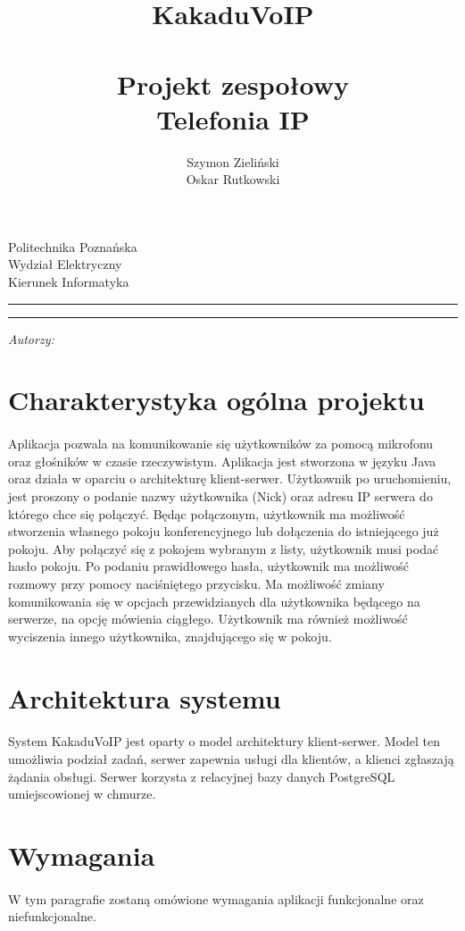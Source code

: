 \documentclass[12pt,a4paper,notitlepage]{report}
\author{Szymon Zieliński \\ Oskar Rutkowski }
\title{KakaduVoIP \\ \\ Projekt zespołowy  \\ Telefonia IP}
\makeatletter
\newcommand{\linia}{\rule{\linewidth}{0.5mm}}
\renewcommand{\maketitle}{\begin{titlepage}
		
		\vspace*{1cm}
		
		\begin{center}\small
			
			Politechnika Poznańska\\
			
			Wydział Elektryczny\\
			
			Kierunek Informatyka
			
		\end{center}
		
		\vspace{3cm}
		
		\linia
		
		\begin{center}
			
			\LARGE \textsc{\@title}
			
		\end{center}
		
		\linia
		
		\vspace{0.5cm}
		
		\begin{flushright}
			
			\begin{minipage}{5cm}
				
				\textit{ Autorzy:}\\
				
				\normalsize{\@author} \par
				
			\end{minipage}
			
		\end{flushright}
		
		\vspace*{\stretch{6}}
		
		\begin{center}
			
			\@date
			
		\end{center}
		
	\end{titlepage}%
	
}
\makeatother
\begin{document}
	
	\maketitle
	\newpage
	\tableofcontents
	\newpage
	
	\section{Charakterystyka ogólna projektu}
	\paragraph*{} Aplikacja pozwala na komunikowanie się użytkowników za pomocą mikrofonu oraz głośników w czasie rzeczywistym. Aplikacja jest stworzona w języku Java oraz działa w oparciu o architekturę klient-serwer. Użytkownik po uruchomieniu, jest proszony o podanie nazwy użytkownika (Nick) oraz adresu IP serwera do którego chce się połączyć. Będąc połączonym, użytkownik ma możliwość stworzenia własnego pokoju konferencyjnego lub dołączenia do istniejącego już pokoju. Aby połączyć się z pokojem wybranym z listy, użytkownik musi podać hasło pokoju. Po podaniu prawidłowego hasła, użytkownik ma możliwość rozmowy przy pomocy naciśniętego przycisku. Ma możliwość zmiany komunikowania się w opcjach przewidzianych dla użytkownika będącego na serwerze, na opcję mówienia ciągłego. Użytkownik ma również możliwość wyciszenia innego użytkownika, znajdującego się w pokoju.
	\section{Architektura systemu}
	\paragraph*{} System KakaduVoIP jest oparty o model architektury klient-serwer. Model ten umożliwia podział zadań, serwer zapewnia usługi dla klientów, a klienci zgłaszają żądania obsługi. Serwer korzysta z relacyjnej bazy danych PostgreSQL umiejscowionej w chmurze.
	\section{Wymagania}
	\paragraph*{} W tym paragrafie zostaną omówione wymagania aplikacji funkcjonalne oraz niefunkcjonalne.
\end{document}
